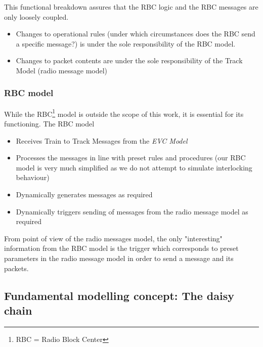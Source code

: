 \documentclass{template/openetcs_article}
\begin{document}
This functional breakdown assures that the RBC logic and the RBC messages are only loosely coupled. 
\begin{itemize}
 \item Changes to operational rules (under which circumstances does the RBC send a specific message?) is under the sole responsibility of the RBC model. 
 \item Changes to packet contents are under the sole responsibility of the Track Model (radio message model)
\end{itemize}
\subsubsection{RBC model}

While the RBC\footnote{RBC = Radio Block Center} model is outside the scope of this work, it is essential for its functioning. The RBC model
\begin{itemize}
 \item Receives Train to Track Messages from the \emph{EVC Model}
 \item Processes the messages in line with preset rules and procedures (our RBC model is very much simplified as we do not attempt to simulate interlocking behaviour)
 \item Dynamically generates messages as required
 \item Dynamically triggers sending of messages from the radio message model as required
\end{itemize}

From point of view of the radio messages model, the only "interesting" information from the RBC model is the trigger which corresponds to preset parameters in the radio message model in order to send a message and its packets.

\subsection{Fundamental modelling concept: The daisy chain}
\end{document}
